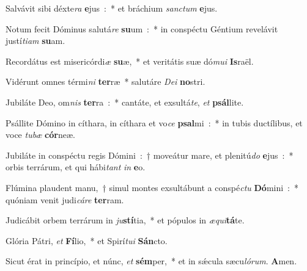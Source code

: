 \item Salvávit sibi déxte\emph{ra} \textbf{e}jus~:~* et bráchium \emph{san}\emph{ctum} \textbf{e}jus.
\item Notum fecit Dóminus salutá\emph{re} \textbf{su}um~:~* in conspéctu Géntium revelávit justí\emph{ti}\emph{am} \textbf{su}am.
\item Recordátus est misericórdi\emph{æ} \textbf{su}æ,~* et veritátis suæ dó\emph{mu}\emph{i} \textbf{Is}raël.
\item Vidérunt omnes térmi\emph{ni} \textbf{ter}ræ~* salutáre \emph{De}\emph{i} \textbf{no}stri.
\item Jubiláte Deo, om\emph{nis} \textbf{ter}ra~:~* cantáte, et exsultá\emph{te}, \emph{et} \textbf{psál}lite.
\item Psállite Dómino in cíthara, in cíthara et vo\emph{ce} \textbf{psal}mi~:~* in tubis ductílibus, et voce \emph{tu}\emph{bæ} \textbf{cór}neæ.
\item Jubiláte in conspéctu regis Dómini~:~† moveátur mare, et plenitú\emph{do} \textbf{e}jus~:~* orbis terrárum, et qui hábi\emph{tant} \emph{in} \textbf{e}o.
\item Flúmina plaudent manu,~† simul montes exsultábunt a conspé\emph{ctu} \textbf{Dó}mini~:~* quóniam venit judi\emph{cá}\emph{re} \textbf{ter}ram.
\item Judicábit orbem terrárum in \emph{ju}\textbf{stí}tia,~* et pópulos in \emph{æ}\emph{qui}\textbf{tá}te.
\item Glória Pátri, \emph{et} \textbf{Fí}lio,~* et Spirí\emph{tu}\emph{i} \textbf{Sán}cto.
\item Sicut érat in princípio, et núnc, \emph{et} \textbf{sém}per,~* et in sǽcula sæcu\emph{ló}\emph{rum}. \textbf{A}men.